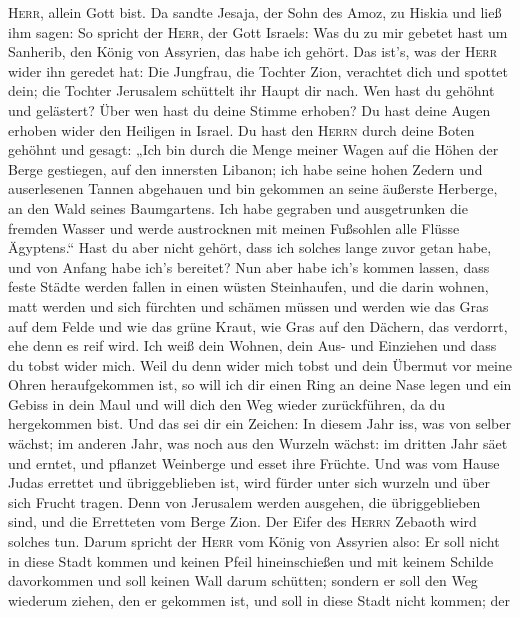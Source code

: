 \textsc{Herr}, allein Gott bist.  Da sandte Jesaja, der
Sohn des Amoz, zu Hiskia und ließ ihm sagen: So spricht der
\textsc{Herr}, der Gott Israels: Was du zu mir gebetet hast um Sanherib,
den König von Assyrien, das habe ich gehört.  Das ist's,
was der \textsc{Herr} wider ihn geredet hat: Die Jungfrau, die Tochter
Zion, verachtet dich und spottet dein; die Tochter Jerusalem schüttelt
ihr Haupt dir nach.  Wen hast du gehöhnt und gelästert?
Über wen hast du deine Stimme erhoben? Du hast deine Augen erhoben wider
den Heiligen in Israel.  Du hast den \textsc{Herrn} durch
deine Boten gehöhnt und gesagt: „Ich bin durch die Menge meiner Wagen
auf die Höhen der Berge gestiegen, auf den innersten Libanon; ich habe
seine hohen Zedern und auserlesenen Tannen abgehauen und bin gekommen an
seine äußerste Herberge, an den Wald seines Baumgartens. 
Ich habe gegraben und ausgetrunken die fremden Wasser und werde
austrocknen mit meinen Fußsohlen alle Flüsse Ägyptens.`` 
Hast du aber nicht gehört, dass ich solches lange zuvor getan habe, und
von Anfang habe ich's bereitet? Nun aber habe ich's kommen lassen, dass
feste Städte werden fallen in einen wüsten Steinhaufen, 
und die darin wohnen, matt werden und sich fürchten und schämen müssen
und werden wie das Gras auf dem Felde und wie das grüne Kraut, wie Gras
auf den Dächern, das verdorrt, ehe denn es reif wird. 
Ich weiß dein Wohnen, dein Aus- und Einziehen und dass du tobst wider
mich.  Weil du denn wider mich tobst und dein Übermut vor
meine Ohren heraufgekommen ist, so will ich dir einen Ring an deine Nase
legen und ein Gebiss in dein Maul und will dich den Weg wieder
zurückführen, da du hergekommen bist.  Und das sei dir
ein Zeichen: In diesem Jahr iss, was von selber wächst; im anderen Jahr,
was noch aus den Wurzeln wächst: im dritten Jahr säet und erntet, und
pflanzet Weinberge und esset ihre Früchte.  Und was vom
Hause Judas errettet und übriggeblieben ist, wird fürder unter sich
wurzeln und über sich Frucht tragen.  Denn von Jerusalem
werden ausgehen, die übriggeblieben sind, und die Erretteten vom Berge
Zion. Der Eifer des \textsc{Herrn} Zebaoth wird solches tun.
 Darum spricht der \textsc{Herr} vom König von Assyrien
also: Er soll nicht in diese Stadt kommen und keinen Pfeil
hineinschießen und mit keinem Schilde davorkommen und soll keinen Wall
darum schütten;  sondern er soll den Weg wiederum ziehen,
den er gekommen ist, und soll in diese Stadt nicht kommen; der
